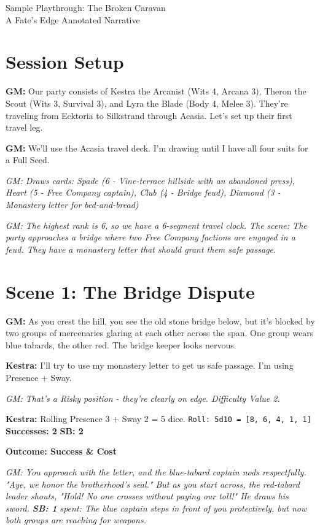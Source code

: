 \documentclass[11pt]{article}
\newcommand{\player}[1]{\textbf{#1:}}
\newcommand{\gm}[1]{\textit{GM: #1}}
\newcommand{\roll}[2]{\texttt{Roll: #1d10 = [#2]}}
\newcommand{\success}[1]{\textbf{Successes: #1}}
\newcommand{\cp}[1]{\textbf{SB: #1}}
\newcommand{\outcome}[1]{\textbf{Outcome: #1}}
\begin{document}
\begin{center}
{\LARGE Sample Playthrough: The Broken Caravan}\\
\vspace{0.5em}
{\large A Fate's Edge Annotated Narrative}
\end{center}

\section*{Session Setup}

\player{GM} Our party consists of Kestra the Arcanist (Wits 4, Arcana 3), Theron the Scout (Wits 3, Survival 3), and Lyra the Blade (Body 4, Melee 3). They're traveling from Ecktoria to Silkstrand through Acasia. Let's set up their first travel leg.

\player{GM} We'll use the Acasia travel deck. I'm drawing until I have all four suits for a Full Seed.

\gm{Draws cards: Spade (6 - Vine-terrace hillside with an abandoned press), Heart (5 - Free Company captain), Club (4 - Bridge feud), Diamond (3 - Monastery letter for bed-and-bread)}

\gm{The highest rank is 6, so we have a 6-segment travel clock. The scene: The party approaches a bridge where two Free Company factions are engaged in a feud. They have a monastery letter that should grant them safe passage.}

\section*{Scene 1: The Bridge Dispute}

\player{GM} As you crest the hill, you see the old stone bridge below, but it's blocked by two groups of mercenaries glaring at each other across the span. One group wears blue tabards, the other red. The bridge keeper looks nervous.

\player{Kestra} I'll try to use my monastery letter to get us safe passage. I'm using Presence + Sway.

\gm{That's a Risky position - they're clearly on edge. Difficulty Value 2.}

\player{Kestra} Rolling Presence 3 + Sway 2 = 5 dice. \roll{5}{8, 6, 4, 1, 1} \success{2} \cp{2}

\outcome{Success \& Cost}

\gm{You approach with the letter, and the blue-tabard captain nods respectfully. "Aye, we honor the brotherhood's seal." But as you start across, the red-tabard leader shouts, "Hold! No one crosses without paying our toll!" He draws his sword. \cp{1} spent: The blue captain steps in front of you protectively, but now both groups are reaching for weapons.}
\end{document}
